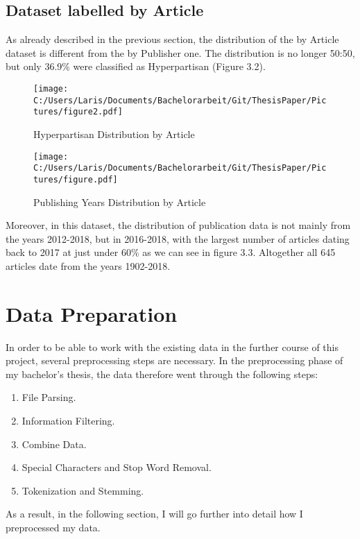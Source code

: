 \documentclass[a4paper, 11pt,titlepage,oneside,openany]{book}
\begin{document}
\subsection{Dataset labelled by Article}

As already described in the previous section, the distribution of the by Article dataset is different from the by Publisher one. The distribution is no longer 50:50, but only 36.9\% were classified as Hyperpartisan (Figure 3.2). 
\begin{figure}[t]
	\begin{minipage}{.45\linewidth}
		\texttt{[image: C:/Users/Laris/Documents/Bachelorarbeit/Git/ThesisPaper/Pictures/figure2.pdf]}
		\caption{Hyperpartisan Distribution by Article}
	\end{minipage}
	\hspace{.1\linewidth}%
	\begin{minipage}{.45\linewidth}
	\texttt{[image: C:/Users/Laris/Documents/Bachelorarbeit/Git/ThesisPaper/Pictures/figure.pdf]}
	\caption{Publishing Years Distribution by Article}
\end{minipage}
\end{figure}
\noindent Moreover, in this dataset, the distribution of publication data is not mainly from the years 2012-2018, but in 2016-2018, with the largest number of articles dating back to 2017 at just under 60\% as we can see in figure 3.3. Altogether all 645 articles date from the years 1902-2018.




\section{Data Preparation}
In order to be able to work with the existing data in the further course of this project, several preprocessing steps are necessary. In the preprocessing phase of my bachelor's thesis, the data therefore went through the following steps:
\begin{enumerate}
	\item File Parsing. 
	\item Information Filtering.
	\item Combine Data.
	\item Special Characters and Stop Word Removal.
	\item Tokenization and Stemming.
\end{enumerate}	
\noindent As a result, in the following section, I will go further into detail how I preprocessed my data.
\end{document}
